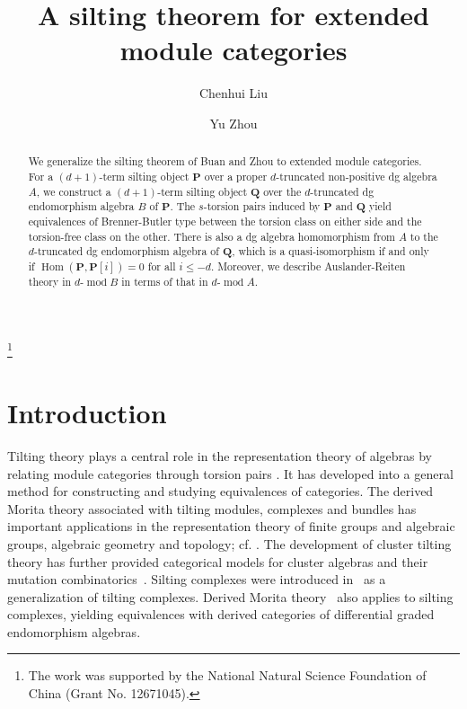 \documentclass[11pt,a4paper,reqno]{amsart}
\theoremstyle{plain}
\numberwithin{equation}{section}
\theoremstyle{definition}
\begin{document}
\title{A silting theorem for extended module categories}
\author{Chenhui Liu}
\address{LC: School of Mathematical Sciences,
Beijing Normal University,
100875 Beijing,
China}

\author{Yu Zhou}
\address{ZY: School of Mathematical Sciences,
Beijing Normal University,
100875 Beijing,
China}

\thanks{The work was supported by the National Natural Science Foundation of China (Grant No. 12671045).}

\begin{abstract}
We generalize the silting theorem of Buan and Zhou to extended module categories. For a $(d+1)$-term silting object $\mathbf{P}$ over a proper $d$-truncated non-positive dg algebra $A$, we construct a $(d+1)$-term silting object $\mathbf{Q}$ over the $d$-truncated dg endomorphism algebra $B$ of $\mathbf{P}$. The $s$-torsion pairs induced by $\mathbf{P}$ and $\mathbf{Q}$ yield equivalences of Brenner-Butler type between the torsion class on either side and the torsion-free class on the other. There is also a dg algebra homomorphism from $A$ to the $d$-truncated dg endomorphism algebra of $\mathbf{Q}$, which is a quasi-isomorphism if and only if $\operatorname{Hom}(\mathbf{P},\mathbf{P}[i])=0$ for all $i\leq-d$. Moreover, we describe Auslander-Reiten theory in ${d\text{-}\operatorname{mod}\!B}$ in terms of that in ${d\text{-}\operatorname{mod}\!A}$.
\end{abstract}

\maketitle

\section{Introduction}\label{sec:introduction}

Tilting theory plays a central role in the representation theory of algebras by relating module categories through torsion pairs \cite{BGP,APR,BB,HR}. It has developed into a general method for constructing and studying equivalences of categories. The derived Morita theory associated with tilting modules, complexes and bundles has important applications in the representation theory of finite groups and algebraic groups, algebraic geometry and topology; cf. \cite{Ric,AHK}. The development of cluster tilting theory has further provided categorical models for cluster algebras and their mutation combinatorics~\cite{BMRRT}. Silting complexes were introduced in~\cite{KV} as a generalization of tilting complexes. Derived Morita theory~\cite{Ke1} also applies to silting complexes, yielding equivalences with derived categories of differential graded endomorphism algebras.
\end{document}
